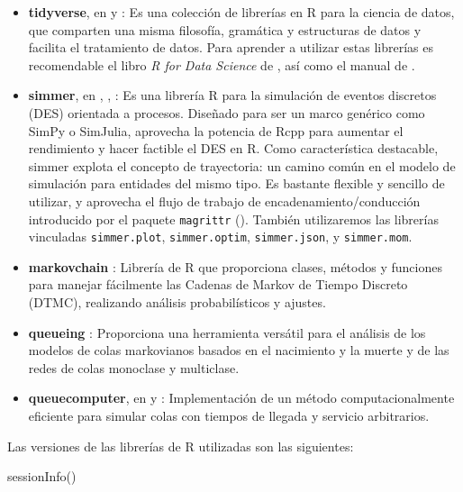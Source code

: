 \documentclass[
]{book}
\newenvironment{Shaded}{\begin{snugshade}}{\end{snugshade}}
\newcommand{\FunctionTok}[1]{\textcolor[rgb]{0.00,0.00,0.00}{#1}}
\newcommand{\NormalTok}[1]{#1}
\theoremstyle{definition}
\theoremstyle{definition}
\theoremstyle{definition}
\theoremstyle{definition}
\theoremstyle{remark}
\begin{document}
\begin{itemize}
\item
  \textbf{tidyverse}, en \citet{tidyverse2019} y \citet{R-tidyverse}: Es una colección de librerías en R para la ciencia de datos, que comparten una misma filosofía, gramática y estructuras de datos y facilita el tratamiento de datos. Para aprender a utilizar estas librerías es recomendable el libro \emph{R for Data Science} de \citet{wickham-grolemund}, así como el manual de \citet{grosser18}.
\item
  \textbf{simmer}, en \citet{simmer2019}, \citet{ucar_smeets}, \citet{R-simmer}: Es una librería R para la simulación de eventos discretos (DES) orientada a procesos. Diseñado para ser un marco genérico como SimPy o SimJulia, aprovecha la potencia de Rcpp para aumentar el rendimiento y hacer factible el DES en R. Como característica destacable, simmer explota el concepto de trayectoria: un camino común en el modelo de simulación para entidades del mismo tipo. Es bastante flexible y sencillo de utilizar, y aprovecha el flujo de trabajo de encadenamiento/conducción introducido por el paquete \texttt{magrittr} (\citet{R-magrittr}). También utilizaremos las librerías vinculadas \texttt{simmer.plot}, \texttt{simmer.optim}, \texttt{simmer.json}, y \texttt{simmer.mom}.
\item
  \textbf{markovchain} \citep{R-markovchain}: Librería de R que proporciona clases, métodos y funciones para manejar fácilmente las Cadenas de Markov de Tiempo Discreto (DTMC), realizando análisis probabilísticos y ajustes.
\item
  \textbf{queueing} \citep{R-queueing}: Proporciona una herramienta versátil para el análisis de los modelos de colas markovianos basados en el nacimiento y la muerte y de las redes de colas monoclase y multiclase.
\item
  \textbf{queuecomputer}, en \citet{queuecomputer2020} y \citet{R-queuecomputer}: Implementación de un método computacionalmente eficiente para simular colas con tiempos de llegada y servicio arbitrarios.
\end{itemize}

Las versiones de las librerías de R utilizadas son las siguientes:

\begin{Shaded}
\begin{Highlighting}[]
\FunctionTok{sessionInfo}\NormalTok{()}
\end{Highlighting}
\end{Shaded}
\end{document}
